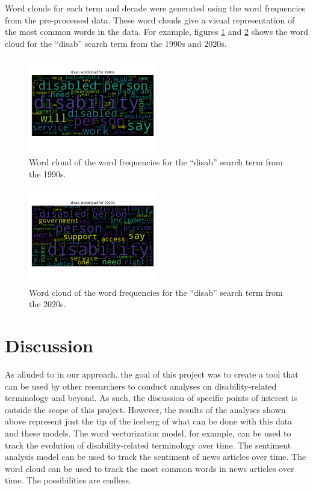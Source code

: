 \documentclass[11pt,a4paper, twocolumn]{article}
\begin{document}
Word clouds for each term and decade were generated using the word frequencies from the pre-processed data. These word clouds give a visual representation of the most common words in the data. For example, figures \ref{wca} and \ref{wcb} shows the word cloud for the ``disab'' search term from the 1990s and 2020s.

\begin{figure}
  \centering
  \includegraphics[width=0.5\textwidth]{lemma_disab_1990_wordcloud.png}
  \caption{\label{wca} Word cloud of the word frequencies for the ``disab'' search term from the 1990s.}
\end{figure}

\begin{figure}
  \centering
  \includegraphics[width=0.5\textwidth]{lemma_disab_2020_wordcloud.png}
  \caption{\label{wcb} Word cloud of the word frequencies for the ``disab'' search term from the 2020s.}
\end{figure}

\section{Discussion}
As alluded to in our approach, the goal of this project was to create a tool that can be used by other researchers to conduct analyses on disability-related terminology and beyond. As such, the discussion of specific points of interest is outside the scope of this project. However, the results of the analyses shown above represent just the tip of the iceberg of what can be done with this data and these models. The word vectorization model, for example, can be used to track the evolution of disability-related terminology over time. The sentiment analysis model can be used to track the sentiment of news articles over time. The word cloud can be used to track the most common words in news articles over time. The possibilities are endless.
\end{document}
